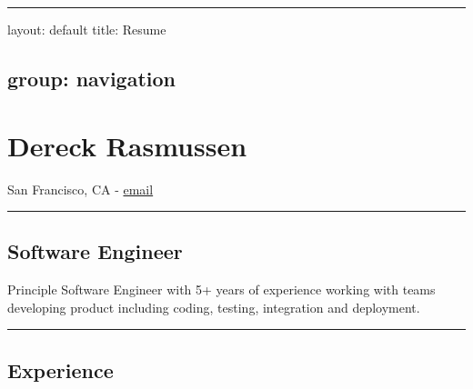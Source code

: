 \documentclass{article}
\begin{document}
 

\vspace{.5em} \hrule \vspace{.5em}
layout: default title: Resume

\hypertarget{group_navigation}{}\subsection*{{group: navigation}}\label{group_navigation}

\hypertarget{dereck_rasmussen}{}\section*{{Dereck Rasmussen}}\label{dereck_rasmussen}

San Francisco, CA - \href{mailto:dereckrx@gmail.com}{email}


\vspace{.5em} \hrule \vspace{.5em}
\hypertarget{software_engineer}{}\subsection*{{Software Engineer}}\label{software_engineer}

Principle Software Engineer with 5+ years of experience working with teams developing product including coding, testing, integration and deployment.


\vspace{.5em} \hrule \vspace{.5em}
\hypertarget{experience}{}\subsection*{{Experience}}\label{experience}
\end{document}
